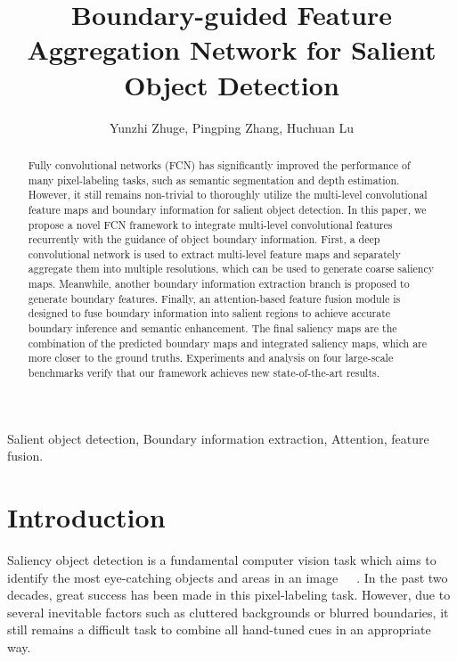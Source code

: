 \documentclass[journal]{IEEEtran}
\begin{document}
\title{Boundary-guided Feature Aggregation Network for Salient Object Detection}
\author{Yunzhi Zhuge, Pingping Zhang, Huchuan Lu}
\maketitle




\begin{abstract}
Fully convolutional networks (FCN) has significantly improved the performance of many pixel-labeling tasks, such as semantic segmentation and depth estimation.
However, it still remains non-trivial to thoroughly utilize the multi-level convolutional feature maps and boundary information for salient object detection.
In this paper, we propose a novel FCN framework to integrate multi-level convolutional features recurrently with the guidance of object boundary information.
First, a deep convolutional network is used to extract multi-level feature maps and separately aggregate them into multiple resolutions, which can be used to generate coarse saliency maps.
Meanwhile, another boundary information extraction branch is proposed to generate boundary features.
Finally, an attention-based feature fusion module is designed to fuse boundary information into salient regions to achieve accurate boundary inference and semantic enhancement.
The final saliency maps are the combination of the predicted boundary maps and integrated saliency maps, which are more closer to the ground truths.
Experiments and analysis on four large-scale benchmarks verify that our framework achieves new state-of-the-art results.
\end{abstract}



\begin{IEEEkeywords}
Salient object detection, Boundary information extraction, Attention, feature fusion.
\end{IEEEkeywords}

\IEEEpeerreviewmaketitle

\section{Introduction}
\label{sec:intro}
Saliency object detection is a fundamental computer vision task which aims to identify the most eye-catching objects and areas in an image~\cite{Itti1998A}\cite{Achanta2009Frequency}~\cite{Tong2015Salient}~\cite{Wang2015Deep}.
In the past two decades, great success has been made in this pixel-labeling task.
However, due to several inevitable factors such as cluttered backgrounds or blurred boundaries, it still remains a difficult task to combine all hand-tuned cues in an appropriate way.
\end{document}
